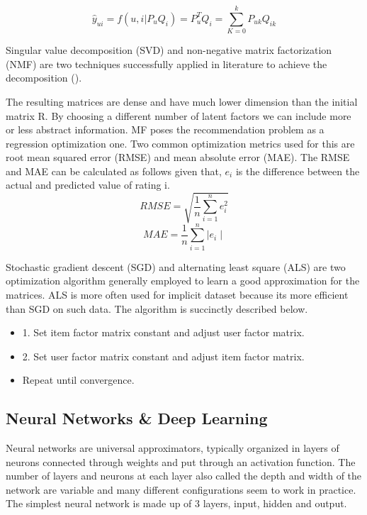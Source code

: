 \begin{equation}
    \hat{y}_{ui} = f(u,i|P_{u}Q_{i}) = P_{u}^{T}Q_{i} = \sum_{K=0}^{k}P_{uk}Q_{ik}
\end{equation}

Singular value decomposition (SVD) and non-negative matrix factorization (NMF) are two techniques successfully applied in literature to achieve the decomposition (\citet{svd}).

The resulting matrices are dense and have much lower dimension than the initial matrix R. By choosing a different number of latent factors we can include more or less abstract information. MF poses the recommendation problem as a regression optimization one. Two common optimization metrics used for this are root mean squared error (RMSE) and mean absolute error (MAE). The RMSE and MAE can be calculated as follows given that, \(e_i\) is the difference between the actual and predicted value of rating i. 
\begin{equation}
    RMSE = \sqrt{\frac{1}{n}\sum_{i=1}^{n}{e^2_i}}
\end{equation}
\begin{equation}
    MAE = \frac{1}{n}\sum_{i=1}^{n}{\mid e_i\mid}
\end{equation}

Stochastic gradient descent (SGD) and alternating least square (ALS) are two optimization algorithm generally employed to learn a good approximation for the matrices. ALS is more often used for implicit dataset because its more efficient than SGD on such data. The algorithm is succinctly described below.
\begin{itemize}
    \item 1. Set item factor matrix constant and adjust user factor matrix.
    \item 2. Set user factor matrix constant and adjust item factor matrix.
    \item Repeat until convergence.
\end{itemize}

\subsection{Neural Networks \& Deep Learning}
Neural networks are universal approximators, typically organized in layers of neurons connected through weights and put through an activation function. The number of layers and neurons at each layer also called the depth and width of the network are variable and many different configurations seem to work in practice. The simplest neural network is made up of 3 layers, input, hidden and output.

